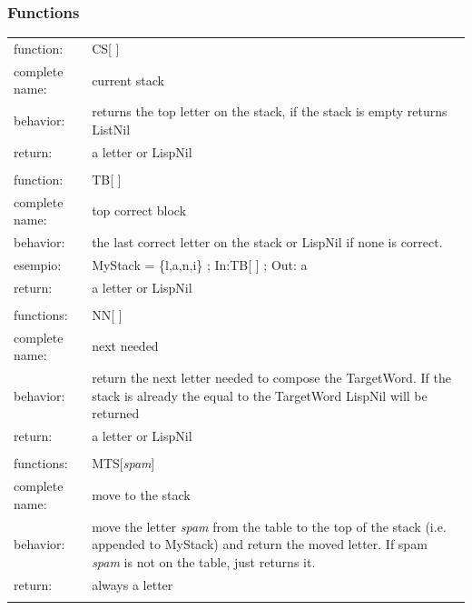 \documentclass[12pt, a4paper]{article}
\begin{document}
\lstset{caption=variables in moves.m,
		label=source:movesvar}


\subsubsection{Functions}
\label{sec:funmoves}

\begin{longtable}{|l|p{10.0cm}|}
\hline
function:		& 	CS[ ]\\
complete name:	& 	current stack\\
behavior:	& 	returns the top letter on the stack, if the stack is empty returns ListNil\\
return:			& 	a letter or LispNil\\
\hline
\multicolumn{2}{|c|}{}\\

\hline
function:		& 	TB[ ]	\\
complete name:	& 	top correct block\\
behavior:	& 	the last correct letter on the stack or LispNil if none is correct.\\
esempio:		&	MyStack = \{l,a,n,i\} ; In:TB[ ] ; Out: a \\
return:			& 	a letter or LispNil\\
\hline
\multicolumn{2}{|c|}{}\\

\hline
functions:		& 	NN[ ]\\
complete name:	& 	next needed\\
behavior:	& 	return the next letter needed to compose the TargetWord. If the stack is already the equal to the TargetWord LispNil will be returned\\
return:			& 	a letter or LispNil\\
\hline
\multicolumn{2}{|c|}{}\\

\hline
functions:		& 	MTS[{\itshape spam}]\\
complete name:	& 	move to the stack\\
behavior:	& 	move the letter {\itshape spam} from the table to the top of the stack (i.e. appended to MyStack) and return the moved letter. If spam {\itshape spam} is not on the table, just returns it.\\
return:			& 	always a letter\\
\hline
\multicolumn{2}{|c|}{}\\


\end{longtable}
\end{document}
